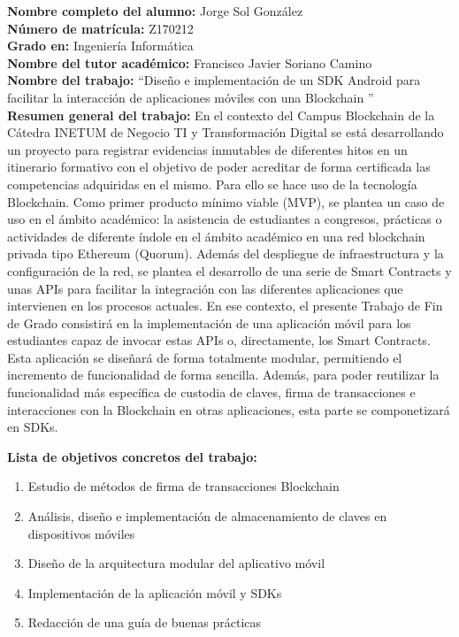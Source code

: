 \documentclass{article}
\begin{document}
\textbf{Nombre completo del alumno:} Jorge Sol González \\
\textbf{Número de matrícula:} Z170212 \\
\textbf{Grado en:} Ingeniería Informática \\
\textbf{Nombre del tutor académico:} Francisco Javier Soriano Camino \\
\textbf{Nombre del trabajo:} “Diseño e implementación de un SDK Android para facilitar la interacción de aplicaciones móviles con una Blockchain ” \\

\vspace{1cm}
\textbf{Resumen general del trabajo:}
En el contexto del Campus Blockchain de la Cátedra INETUM de Negocio TI y Transformación Digital se está desarrollando un proyecto para registrar evidencias inmutables de diferentes hitos en un itinerario formativo con el objetivo de poder acreditar de forma certificada las competencias adquiridas en el mismo. Para ello se hace uso de la tecnología Blockchain. Como primer producto mínimo viable (MVP), se plantea un caso de uso en el ámbito académico: la asistencia de estudiantes a congresos, prácticas o actividades de diferente índole en el ámbito académico en una red blockchain privada tipo Ethereum (Quorum). Además del despliegue de infraestructura y la configuración de la red, se plantea el desarrollo de una serie de Smart Contracts y unas APIs para facilitar la integración con las diferentes aplicaciones que intervienen en los procesos actuales.  En ese contexto, el presente Trabajo de Fin de Grado consistirá en la implementación de una aplicación móvil para los estudiantes capaz de invocar estas APIs o, directamente, los Smart Contracts. Esta aplicación se diseñará de forma totalmente modular, permitiendo el incremento de funcionalidad de forma sencilla. Además, para poder reutilizar la funcionalidad más específica de custodia de claves, firma de transacciones e interacciones con la Blockchain en otras aplicaciones, esta parte se componetizará en SDKs.

\vspace{1cm}
\textbf{Lista de objetivos concretos del trabajo:}
\begin{enumerate}
  \item Estudio de métodos de firma de transacciones Blockchain
  \item Análisis, diseño e implementación de almacenamiento de claves en dispositivos móviles
  \item Diseño de la arquitectura modular del aplicativo móvil
  \item Implementación de la aplicación móvil y SDKs
  \item Redacción de una guía de buenas prácticas
\end{enumerate}
\end{document}
